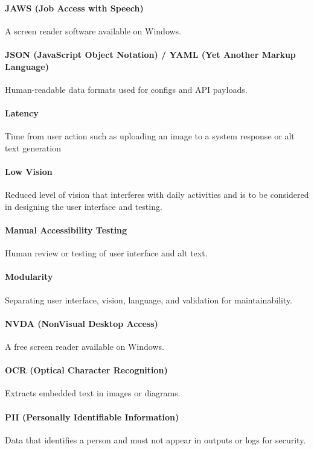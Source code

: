\documentclass[12pt, titlepage]{article}
\begin{document}
\paragraph*{JAWS (Job Access with Speech)}
A screen reader software available on Windows.

\paragraph*{JSON (JavaScript Object Notation) / YAML (Yet Another
Markup Language)}
Human-readable data formats used for configs and API payloads.

\paragraph*{Latency}
Time from user action such as uploading an image to a system response
or alt text generation

\paragraph*{Low Vision}
Reduced level of vision that interferes with daily activities and is
to be considered in designing the user interface and testing.

\paragraph*{Manual Accessibility Testing}
Human review or testing of user interface and alt text.

\paragraph*{Modularity}
Separating user interface, vision, language, and validation for maintainability.

\paragraph*{NVDA (NonVisual Desktop Access)}
A free screen reader available on Windows.

\paragraph*{OCR (Optical Character Recognition)}
Extracts embedded text in images or diagrams.

\paragraph*{PII (Personally Identifiable Information)}
Data that identifies a person and must not appear in outputs or logs
for security.
\end{document}
